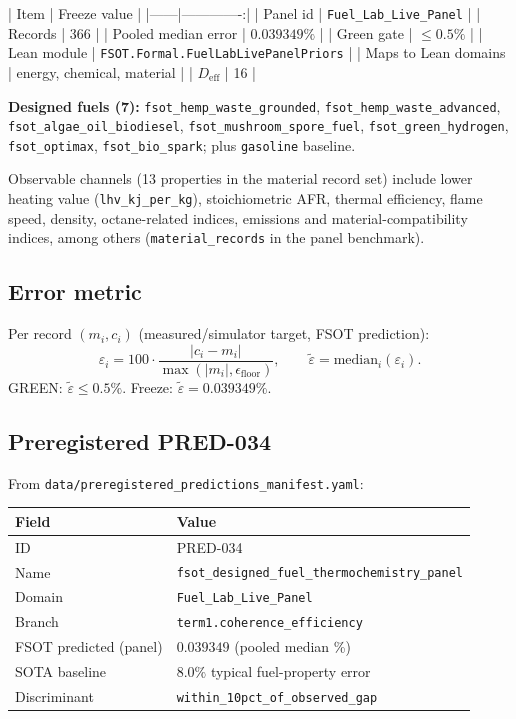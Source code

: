 \documentclass[11pt,a4paper]{article}
\begin{document}
| Item | Freeze value |
|------|-------------:|
| Panel id | \texttt{Fuel\_Lab\_Live\_Panel} |
| Records | 366 |
| Pooled median error | $0.039349\%$ |
| Green gate | $\le 0.5\%$ |
| Lean module | \texttt{FSOT.Formal.FuelLabLivePanelPriors} |
| Maps to Lean domains | energy, chemical, material |
| $D_{\mathrm{eff}}$ | 16 |

\textbf{Designed fuels (7):}
\texttt{fsot\_hemp\_waste\_grounded},
\texttt{fsot\_hemp\_waste\_advanced},
\texttt{fsot\_algae\_oil\_biodiesel},
\texttt{fsot\_mushroom\_spore\_fuel},
\texttt{fsot\_green\_hydrogen},
\texttt{fsot\_optimax},
\texttt{fsot\_bio\_spark};
plus \texttt{gasoline} baseline.

Observable channels (13 properties in the material record set) include
lower heating value (\texttt{lhv\_kj\_per\_kg}), stoichiometric AFR,
thermal efficiency, flame speed, density, octane-related indices, emissions
and material-compatibility indices, among others
(\texttt{material\_records} in the panel benchmark).

\subsection{Error metric}

Per record $(m_i,c_i)$ (measured/simulator target, FSOT prediction):
\begin{equation}
\varepsilon_i=100\cdot\frac{|c_i-m_i|}{\max(|m_i|,\epsilon_{\mathrm{floor}})},
\qquad
\tilde{\varepsilon}=\mathrm{median}_i(\varepsilon_i).
\end{equation}
GREEN: $\tilde{\varepsilon}\le 0.5\%$.
Freeze: $\tilde{\varepsilon}=0.039349\%$.

\subsection{Preregistered PRED-034}

From \texttt{data/preregistered\_predictions\_manifest.yaml}:

\begin{center}
\begin{tabular}{@{}ll@{}}
\toprule
Field & Value \\
\midrule
ID & PRED-034 \\
Name & \texttt{fsot\_designed\_fuel\_thermochemistry\_panel} \\
Domain & \texttt{Fuel\_Lab\_Live\_Panel} \\
Branch & \texttt{term1.coherence\_efficiency} \\
FSOT predicted (panel) & $0.039349$ (pooled median \%) \\
SOTA baseline & $8.0\%$ typical fuel-property error \\
Discriminant & \texttt{within\_10pct\_of\_observed\_gap} \\
\bottomrule
\end{tabular}
\end{center}
\end{document}
